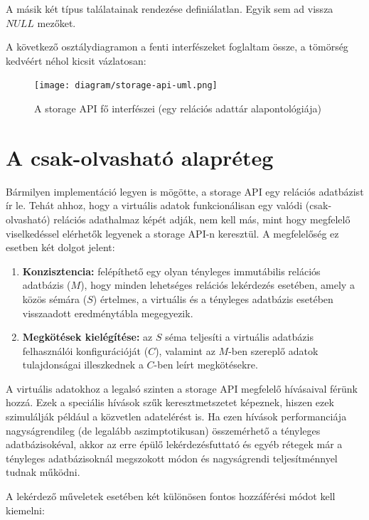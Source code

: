 \documentclass[
    parspace,
    noindent,
    nohyp,
]{elteiktdk}[2023/04/10]
\begin{document}
A másik két típus találatainak rendezése definiálatlan.
Egyik sem ad vissza $NULL$ mezőket.

A következő osztálydiagramon a fenti interfészeket foglaltam össze,
a tömörség kedvéért néhol kicsit vázlatosan:

\begin{figure}[H]
\centering
\texttt{[image: diagram/storage-api-uml.png]}
\caption{A storage API fő interfészei (egy relációs adattár alapontológiája)}
\end{figure}

\section{A csak-olvasható alapréteg}

Bármilyen implementáció legyen is mögötte, a storage API egy relációs adatbázist ír le.
Tehát ahhoz, hogy a virtuális adatok funkcionálisan egy valódi (csak-olvasható) relációs adathalmaz képét adják,
nem kell más, mint hogy megfelelő viselkedéssel elérhetők legyenek a storage API-n keresztül.
A megfelelőség ez esetben két dolgot jelent:

\begin{enumerate}
  \item \textbf{Konzisztencia:}
        felépíthető egy olyan tényleges immutábilis relációs adatbázis ($M$),
        hogy minden lehetséges relációs lekérdezés esetében, amely a közös sémára ($S$) értelmes,
        a virtuális és a tényleges adatbázis esetében visszaadott eredménytábla megegyezik.
  \item \textbf{Megkötések kielégítése:}
        az $S$ séma teljesíti a virtuális adatbázis felhasználói konfigurációját ($C$),
        valamint az $M$-ben szereplő adatok tulajdonságai illeszkednek a $C$-ben leírt megkötésekre.
\end{enumerate}

A virtuális adatokhoz a legalsó szinten a storage API megfelelő hívásaival férünk hozzá.
Ezek a speciális hívások szűk keresztmetszetet képeznek,
hiszen ezek szimulálják például a közvetlen adatelérést is.
Ha ezen hívások performanciája nagyságrendileg (de legalább aszimptotikusan) összemérhető a tényleges adatbázisokéval,
akkor az erre épülő lekérdezésfuttató és egyéb rétegek már
a tényleges adatbázisoknál megszokott módon és nagyságrendi teljesítménnyel tudnak működni.

A lekérdező műveletek esetében két különösen fontos hozzáférési módot kell kiemelni:
\end{document}
